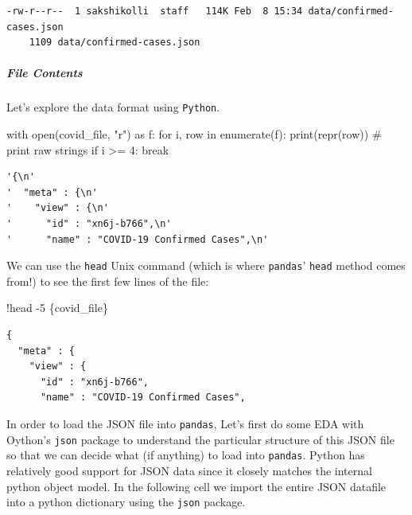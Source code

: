 \documentclass[
  letterpaper,
  DIV=11,
  numbers=noendperiod]{scrreprt}
\let\oldsubparagraph\subparagraph
\renewcommand{\subparagraph}[1]{\oldsubparagraph{#1}\mbox{}}
\newenvironment{Shaded}{\begin{snugshade}}{\end{snugshade}}
\newcommand{\BuiltInTok}[1]{\textcolor[rgb]{0.00,0.23,0.31}{#1}}
\newcommand{\CommentTok}[1]{\textcolor[rgb]{0.37,0.37,0.37}{#1}}
\newcommand{\ControlFlowTok}[1]{\textcolor[rgb]{0.00,0.23,0.31}{#1}}
\newcommand{\DecValTok}[1]{\textcolor[rgb]{0.68,0.00,0.00}{#1}}
\newcommand{\ImportTok}[1]{\textcolor[rgb]{0.00,0.46,0.62}{#1}}
\newcommand{\KeywordTok}[1]{\textcolor[rgb]{0.00,0.23,0.31}{#1}}
\newcommand{\NormalTok}[1]{\textcolor[rgb]{0.00,0.23,0.31}{#1}}
\newcommand{\OperatorTok}[1]{\textcolor[rgb]{0.37,0.37,0.37}{#1}}
\newcommand{\StringTok}[1]{\textcolor[rgb]{0.13,0.47,0.30}{#1}}
\begin{document}
\begin{verbatim}
-rw-r--r--  1 sakshikolli  staff   114K Feb  8 15:34 data/confirmed-cases.json
    1109 data/confirmed-cases.json
\end{verbatim}

\subparagraph{File Contents}\label{file-contents}

Let's explore the data format using \texttt{Python}.

\begin{Shaded}
\begin{Highlighting}[]
\ControlFlowTok{with} \BuiltInTok{open}\NormalTok{(covid\_file, }\StringTok{"r"}\NormalTok{) }\ImportTok{as}\NormalTok{ f:}
    \ControlFlowTok{for}\NormalTok{ i, row }\KeywordTok{in} \BuiltInTok{enumerate}\NormalTok{(f):}
        \BuiltInTok{print}\NormalTok{(}\BuiltInTok{repr}\NormalTok{(row)) }\CommentTok{\# print raw strings}
        \ControlFlowTok{if}\NormalTok{ i }\OperatorTok{\textgreater{}=} \DecValTok{4}\NormalTok{: }\ControlFlowTok{break}
\end{Highlighting}
\end{Shaded}

\begin{verbatim}
'{\n'
'  "meta" : {\n'
'    "view" : {\n'
'      "id" : "xn6j-b766",\n'
'      "name" : "COVID-19 Confirmed Cases",\n'
\end{verbatim}

We can use the \texttt{head} Unix command (which is where
\texttt{pandas}' \texttt{head} method comes from!) to see the first few
lines of the file:

\begin{Shaded}
\begin{Highlighting}[]
\OperatorTok{!}\NormalTok{head }\OperatorTok{{-}}\DecValTok{5}\NormalTok{ \{covid\_file\}}
\end{Highlighting}
\end{Shaded}

\begin{verbatim}
{
  "meta" : {
    "view" : {
      "id" : "xn6j-b766",
      "name" : "COVID-19 Confirmed Cases",
\end{verbatim}

In order to load the JSON file into \texttt{pandas}, Let's first do some
EDA with Oython's \texttt{json} package to understand the particular
structure of this JSON file so that we can decide what (if anything) to
load into \texttt{pandas}. Python has relatively good support for JSON
data since it closely matches the internal python object model. In the
following cell we import the entire JSON datafile into a python
dictionary using the \texttt{json} package.
\end{document}
